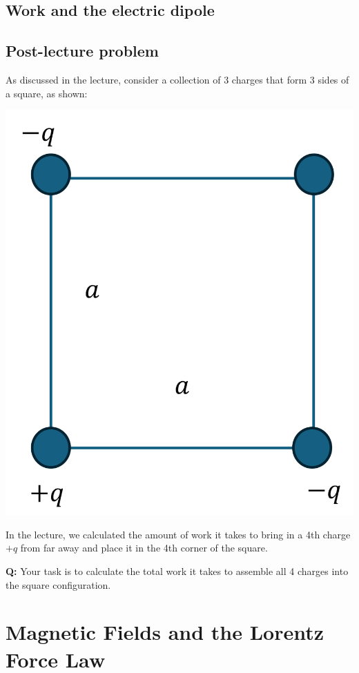\documentclass[
  letterpaper,
  DIV=11,
  numbers=noendperiod]{scrreprt}
\begin{document}
\section{Work and the electric
dipole}\label{work-and-the-electric-dipole}

\section{Post-lecture problem}\label{post-lecture-problem-2}

As discussed in the lecture, consider a collection of 3 charges that
form 3 sides of a square, as shown:

\includegraphics{Figures/L3_3charges.png}

In the lecture, we calculated the amount of work it takes to bring in a
4th charge \(+q\) from far away and place it in the 4th corner of the
square.

\textbf{Q:} Your task is to calculate the total work it takes to
assemble all 4 charges into the square configuration.


\chapter{Magnetic Fields and the Lorentz Force
Law}\label{magnetic-fields-and-the-lorentz-force-law}
\end{document}
